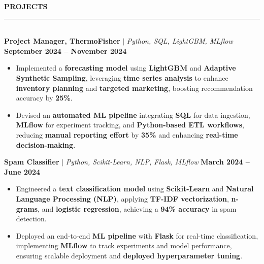 \documentclass{article}
\begin{document}
\noindent \textbf{{PROJECTS}} \vspace{-8pt} \\
\rule{\linewidth}{0.5pt} \\
\noindent \textbf{Project Manager, ThermoFisher} $\mid$ \textit{Python, SQL, LightGBM, MLflow} \hfill \textbf{September 2024 -- November 2024}  
\begin{itemize}[noitemsep, nolistsep, leftmargin=*]
  \item Implemented a \textbf{forecasting model} using \textbf{LightGBM} and \textbf{Adaptive Synthetic Sampling}, leveraging \textbf{time series analysis} to enhance \textbf{inventory planning} and \textbf{targeted marketing}, boosting recommendation accuracy by \textbf{25\%}.
   \item Devised an \textbf{automated ML pipeline} integrating \textbf{SQL} for data ingestion, \textbf{MLflow} for experiment tracking, and \textbf{Python-based ETL workflows}, reducing \textbf{manual reporting effort} by \textbf{35\%} and enhancing \textbf{real-time decision-making}.
\end{itemize}
\vspace{2mm}

\noindent \textbf{Spam Classifier} $\mid$ \textit{Python, Scikit-Learn, NLP, Flask, MLflow} \hfill \textbf{March 2024 – June 2024} 
\begin{itemize}[noitemsep, nolistsep, leftmargin=*]
    \item Engineered a \textbf{text classification model} using \textbf{Scikit-Learn} and \textbf{Natural Language Processing (NLP)}, applying \textbf{TF-IDF vectorization}, \textbf{n-grams}, and \textbf{logistic regression}, achieving a \textbf{94\% accuracy} in spam detection.
    \item Deployed an end-to-end \textbf{ML pipeline} with \textbf{Flask} for real-time classification, implementing \textbf{MLflow} to track experiments and model performance, ensuring scalable deployment and \textbf{deployed hyperparameter tuning}.
\end{itemize}


\vspace{3mm}
\end{document}
